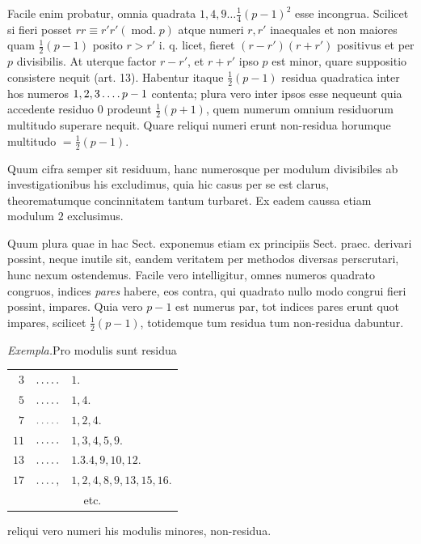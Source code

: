 Facile enim probatur, omnia quadrata $1,4,9\ldots\tfrac14(p-1)^2$ esse incongrua. Scilicet si fieri posset $rr\equiv r'r'(\operatorname{mod.}p)$ atque numeri $r,r'$ inaequales et non maiores quam $\tfrac12(p-1)$ posito $r>r'$ i. q. licet, fieret $(r-r')(r+r')$ positivus et
per $p$ divisibilis. At uterque factor $r-r'$, et $r+r'$ ipso $p$ est minor, quare suppositio consistere nequit (art. 13). Habentur itaque $\tfrac12(p-1)$ residua quadratica inter hos numeros $1,2,3\mathinner{\ldotp\ldotp\ldotp\ldotp} p-1$ contenta; plura vero inter ipsos esse nequeunt quia accedente residuo $0$ prodeunt $\tfrac12(p+1)$, quem numerum omnium residuorum multitudo superare nequit. Quare reliqui numeri erunt non-residua horumque multitudo $=\tfrac12(p-1)$.

Quum cifra semper sit residuum, hanc numerosque per modulum divisibiles ab investigationibus his excludimus, quia hic casus per se est clarus, theorematumque concinnitatem tantum turbaret. Ex eadem caussa etiam modulum $2$ exclusimus.

Quum plura quae in hac Sect. exponemus etiam ex principiis Sect. praec. derivari possint, neque inutile sit, eandem veritatem per methodos diversas perscrutari, hunc nexum ostendemus. Facile vero intelligitur, omnes numeros quadrato congruos, indices \emph{pares} habere, eos contra, qui quadrato nullo modo congrui fieri possint, impares. Quia vero $p-1$ est numerus par, tot indices pares erunt quot impares, scilicet $\tfrac12(p-1)$, totidemque tum residua tum non-residua dabuntur.

\emph{Exempla.}\quad Pro modulis sunt residua
\begin{center}
\begin{tabular}{@{}r@{\quad}c@{\quad}l@{}}
$3$ & $\mathinner{\ldotp\ldotp\ldotp\ldotp\ldotp}$ & $1.$\\
$5$ & $\mathinner{\ldotp\ldotp\ldotp\ldotp\ldotp}$ & $1,4.$\\
$7$ & $\mathinner{\ldotp\ldotp\ldotp\ldotp\ldotp}$ & $1,2,4.$\\
$11$ & $\mathinner{\ldotp\ldotp\ldotp\ldotp\ldotp}$ & $1,3,4,5,9.$\\
$13$ & $\mathinner{\ldotp\ldotp\ldotp\ldotp\ldotp}$ & $1.3.4,9,10,12.$\\
$17$ & $\mathinner{\ldotp\ldotp\ldotp\ldotp},$ & $1,2,4,8,9,13,15,16.$\\
\multicolumn{3}{c}{etc.}
\end{tabular}
\end{center}
reliqui vero numeri his modulis minores, non-residua.

